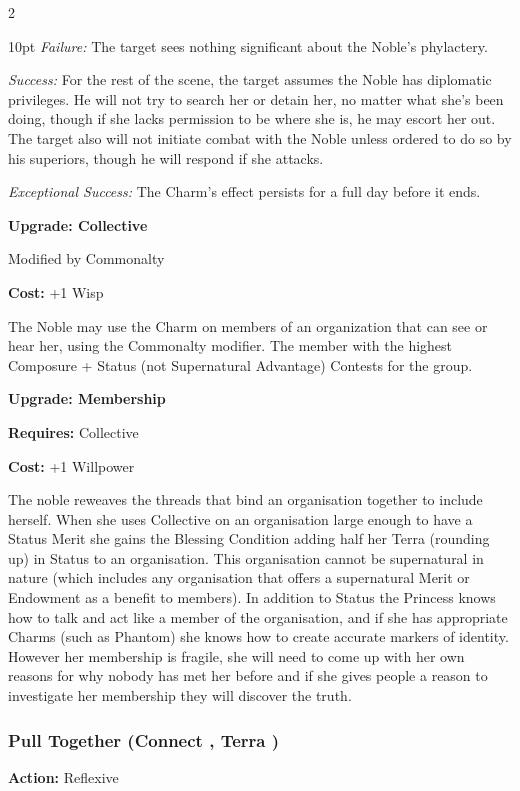 \begin{multicols}{2}
\begin{myindentpar}{10pt}
    \emph{Failure:} The target sees nothing significant about the Noble’s phylactery.

    \emph{Success:}  For the rest of the scene, the target assumes the Noble has diplomatic privileges. He will not try to search her or detain her, no matter what she’s been doing, though if she lacks permission to be where she is, he may escort her out. The target also will not initiate combat with the Noble unless ordered to do so by his superiors, though he will respond if she attacks.

    \emph{Exceptional Success:}  The Charm’s effect persists for a full day before it ends.
	
	\textbf{Upgrade: Collective}

	Modified by Commonalty

	\textbf{Cost:} +1 Wisp

	The Noble may use the Charm on members of an organization that can see or hear her, using the Commonalty modifier. The member with the highest Composure + Status (not Supernatural Advantage) Contests for the group.
	
	\textbf{Upgrade: Membership}
	
	\textbf{Requires:} Collective
	
	\textbf{Cost:} +1 Willpower
	
	The noble reweaves the threads that bind an organisation together to include herself. When she uses Collective on an organisation large enough to have a Status Merit she gains the Blessing Condition adding half her Terra (rounding up) in Status to an organisation. This organisation cannot be supernatural in nature (which includes any organisation that offers a supernatural Merit or Endowment as a benefit to members). In addition to Status the Princess knows how to talk and act like a member of the organisation, and if she has appropriate Charms (such as Phantom) she knows how to create accurate markers of identity. However her membership is fragile, she will need to come up with her own reasons for why nobody has met her before and if she gives people a reason to investigate her membership they will discover the truth. 
	\end{myindentpar}
	
\subsubsection*{Pull Together (Connect \textbullet, Terra \textbullet\textbullet)}

\noindent \textbf{Action:} Reflexive


\end{multicols}
